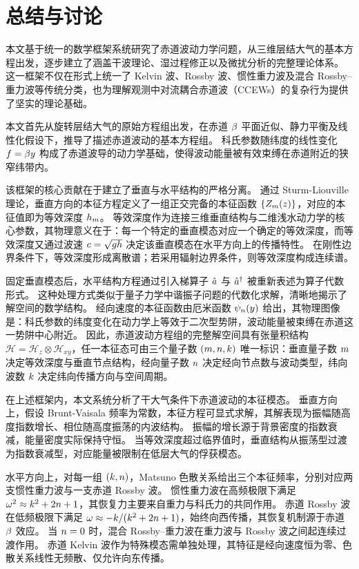 \section{总结与讨论}
\label{sec:conclusion}

本文基于统一的数学框架系统研究了赤道波动力学问题，从三维层结大气的基本方程出发，逐步建立了涵盖干波理论、湿过程修正以及微扰分析的完整理论体系。
这一框架不仅在形式上统一了 Kelvin 波、Rossby 波、惯性重力波及混合 Rossby--重力波等传统分类，也为理解观测中对流耦合赤道波（CCEWs）的复杂行为提供了坚实的理论基础。

本文首先从旋转层结大气的原始方程组出发，在赤道 $\beta$ 平面近似、静力平衡及线性化假设下，推导了描述赤道波动的基本方程组。
科氏参数随纬度的线性变化 $f = \beta y$ 构成了赤道波导的动力学基础，使得波动能量被有效束缚在赤道附近的狭窄纬带内。

该框架的核心贡献在于建立了垂直与水平结构的严格分离。
通过 Sturm-Liouville 理论，垂直方向的本征方程定义了一组正交完备的本征函数 $\{Z_m(z)\}$，对应的本征值即为等效深度 $h_m$。
等效深度作为连接三维垂直结构与二维浅水动力学的核心参数，其物理意义在于：每一个特定的垂直模态对应一个确定的等效深度，而等效深度又通过波速 $c = \sqrt{gh}$ 决定该垂直模态在水平方向上的传播特性。
在刚性边界条件下，等效深度形成离散谱；若采用辐射边界条件，则等效深度构成连续谱。

固定垂直模态后，水平结构方程通过引入梯算子 $\hat{a}$ 与 $\hat{a}^{\dagger}$ 被重新表述为算子代数形式。
这种处理方式类似于量子力学中谐振子问题的代数化求解，清晰地揭示了解空间的数学结构。
经向速度的本征函数由厄米函数 $\psi_{n}(y)$ 给出，其物理图像是：科氏参数的纬度变化在动力学上等效于二次型势阱，波动能量被束缚在赤道这一势阱中心附近。
因此，赤道波动方程组的完整解空间具有张量积结构 $\mathcal{H} = \mathcal{H}_z \otimes \mathcal{H}_{xy}$，任一本征态可由三个量子数 $(m, n, k)$ 唯一标识：垂直量子数 $m$ 决定等效深度与垂直节点结构，经向量子数 $n$ 决定经向节点数与波动类型，纬向波数 $k$ 决定纬向传播方向与空间周期。

在上述框架内，本文系统分析了干大气条件下赤道波动的本征模态。
垂直方向上，假设 Brunt-Vaisala 频率为常数，本征方程可显式求解，其解表现为振幅随高度指数增长、相位随高度振荡的内波结构。
振幅的增长源于背景密度的指数衰减，能量密度实际保持守恒。
当等效深度超过临界值时，垂直结构从振荡型过渡为指数衰减型，对应能量被限制在低层大气的俘获模态。

水平方向上，对每一组 $(k, n)$，Matsuno 色散关系给出三个本征频率，分别对应两支惯性重力波与一支赤道 Rossby 波。
惯性重力波在高频极限下满足 $\omega^2 \approx k^2 + 2n + 1$，其恢复力主要来自重力与科氏力的共同作用。
赤道 Rossby 波在低频极限下满足 $\omega \approx -k/(k^2 + 2n + 1)$，始终向西传播，其恢复机制源于赤道 $\beta$ 效应。
当 $n = 0$ 时，混合 Rossby--重力波在重力波与 Rossby 波之间起连续过渡作用。
赤道 Kelvin 波作为特殊模态需单独处理，其特征是经向速度恒为零、色散关系线性无频散、仅允许向东传播。

